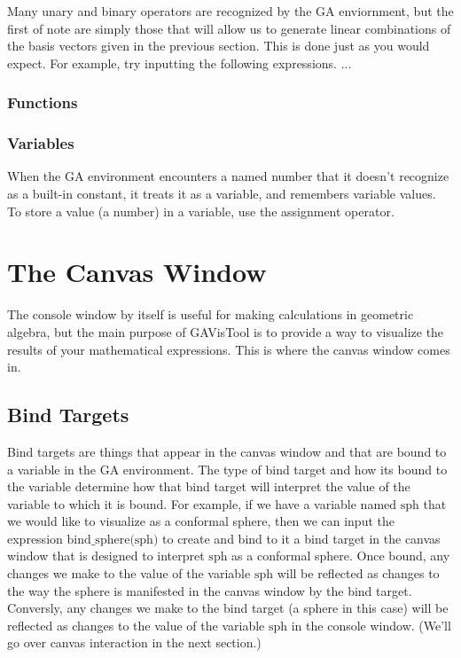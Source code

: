 \documentclass[12pt]{article}
\begin{document}
Many unary and binary operators are recognized by the GA enviornment, but the first
of note are simply those that will allow us to generate linear combinations of the basis
vectors given in the previous section.  This is done just as you would expect.
For example, try inputting the following expressions.
...

\subsubsection{Functions}

\subsubsection{Variables}

When the GA environment encounters a named number that it doesn't recognize
as a built-in constant, it treats it as a variable, and remembers variable values.
To store a value (a number) in a variable, use the assignment operator.

\section{The Canvas Window}

The console window by itself is useful for making calculations in geometric algebra, but the main
purpose of GAVisTool is to provide a way to visualize the results of your mathematical expressions.
This is where the canvas window comes in.

\subsection{Bind Targets}

Bind targets are things that appear in the canvas window and that are bound to a variable
in the GA environment.  The type of bind target and how its bound to the variable determine
how that bind target will interpret the value of the variable to which it is bound.  For example,
if we have a variable named $\mbox{sph}$ that we would like to visualize as a conformal
sphere, then we can input the expression $\mbox{bind\_sphere(sph)}$ to create and bind to it
a bind target in the canvas window that is designed to interpret $\mbox{sph}$ as a conformal sphere.
Once bound, any changes we make to the value of the variable $\mbox{sph}$ will be reflected
as changes to the way the sphere is manifested in the canvas window by the bind target.
Conversly, any changes we make to the bind target (a sphere in this case) will be reflected
as changes to the value of the variable $\mbox{sph}$ in the console window.  (We'll go over
canvas interaction in the next section.)
\end{document}
